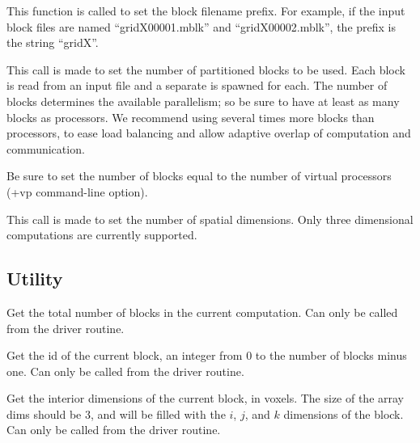 \documentclass[10pt]{article}
\begin{document}
\vspace{0.2in}
This function is called to set the block filename prefix. 
For example, if the input block files are named ``gridX00001.mblk''
and ``gridX00002.mblk'', the prefix is the string ``gridX''.

\vspace{0.2in}
This call is made to set the number of partitioned blocks to be used.
Each block is read from an input file and a separate 
is spawned for each.  The number of blocks determines the available
parallelism; so be sure to have at least as many blocks as processors.
We recommend using several times more blocks than processors, to ease 
load balancing and allow adaptive overlap of computation and communication.

Be sure to set the number of blocks equal to the number of virtual 
processors (+vp command-line option).

\vspace{0.2in}
This call is made to set the number of spatial dimensions. 
Only three dimensional computations are currently supported.

\subsection{Utility}

Get the total number of blocks in the current computation.  
Can only be called from the driver routine.

\vspace{0.2in}
Get the id of the current block, an integer from 0 to the number of blocks minus one. 
Can only be called from the driver routine. 

\vspace{0.2in}
Get the interior dimensions of the current block, in voxels. 
The size of the array dims should be 3, and will be filled with
the $i$, $j$, and $k$ dimensions of the block. 
Can only be called from the driver routine. 
\end{document}
